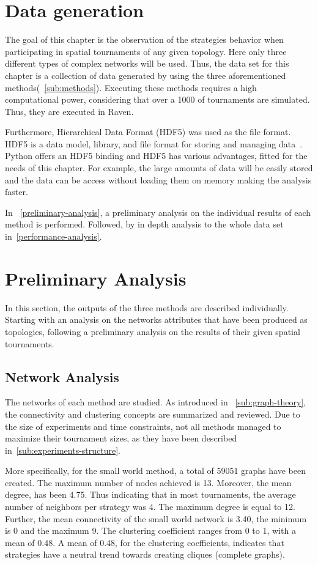\section{Data generation}
The goal of this chapter is the observation of the strategies behavior when
participating in spatial tournaments of any given topology. Here only three
different types of complex networks will be used. Thus, the data set for this
chapter is a collection of data generated by using the three aforementioned
methods(~\autoref{sub:methods}). Executing these methods requires a high
computational power, considering that over a 1000 of tournaments are
simulated. Thus, they are executed in Raven.

Furthermore, Hierarchical Data Format (HDF5) was used as the file format.
HDF5 is a data model, library, and file format for storing and managing data~\cite{hdf5}.
Python offers an HDF5 binding and HDF5 has various advantages, fitted for the needs
of this chapter. For example, the large amounts of data will be easily stored
and the data can be access without loading them on memory making the analysis
faster.

In ~\autoref{preliminary-analysis}, a preliminary analysis on the individual results of each method
is performed. Followed, by in depth analysis to the whole data set in~\autoref{performance-analysis}.

\section{Preliminary Analysis}
\label{preliminary-analysis}
In this section, the outputs of the three methods are described individually.
Starting with an analysis on the networks attributes that have been produced as topologies,
following a preliminary analysis on the results of their given spatial tournaments.

\subsection{Network Analysis}
\label{sub:network-analysis}
The networks of each method are studied. As introduced in ~\autoref{sub:graph-theory}, the
connectivity and clustering concepts are summarized and reviewed. Due to the
size of experiments and time constraints, not all methods managed to
maximize their tournament sizes, as they have been described in~\autoref{sub:experiments-structure}.

More specifically, for the small world method, a total of 59051 graphs have
been created. The maximum number of nodes achieved is 13. Moreover, the
mean degree, has been 4.75. Thus indicating that
in most tournaments, the average number of neighbors per strategy was 4.
The maximum degree is equal to 12. Further,
the mean connectivity of the small world network is 3.40, the minimum is 0 and the maximum 9.
The clustering coefficient ranges from 0 to 1, with a mean of 0.48. A mean
of 0.48, for the clustering coefficients, indicates that strategies have a
neutral trend towards creating cliques (complete graphs).

